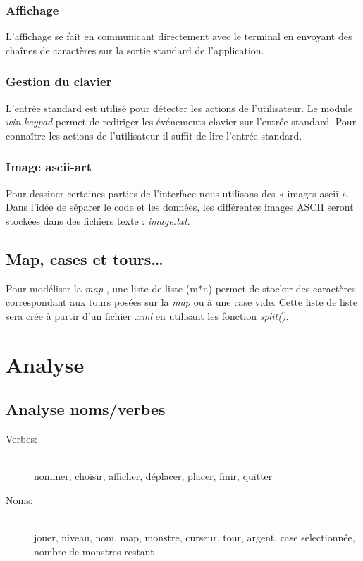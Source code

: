 \documentclass[a4paper]{article}
\begin{document}
            \subsubsection{Affichage}
            L'affichage se fait en communicant directement avec le terminal en envoyant des chaînes de
            caractères sur la sortie standard de l'application.

            \subsubsection{Gestion du clavier}
            L'entrée standard est utilisé pour détecter les actions de l'utilisateur.
            Le module \emph{win.keypad} permet de rediriger les événements clavier sur l'entrée standard.
            Pour connaître les actions de l'utilisateur il suffit de lire l'entrée standard.

            \subsubsection{Image ascii-art}
            Pour dessiner certaines parties de l'interface nous utilisons des « images ascii ».
            Dans l'idée de séparer le code et les données, les différentes images ASCII seront stockées dans des fichiers texte : \emph{image.txt}.

        \subsection{Map, cases et tours\ldots}
        Pour modéliser la \emph{map} , une liste de liste (m*n) permet de stocker des caractères correspondant aux tours posées sur la \emph{map} ou à une case vide.
        Cette liste de liste sera crée à partir d'un fichier .\emph{xml} en utilisant les fonction \emph{split()}.
    
    \section{Analyse}
        \subsection{Analyse noms/verbes}
            \begin{description}
                \item[Verbes:] \hfill \\
                    nommer, choisir, afficher, déplacer, placer, finir, quitter
                \item[Noms:] \hfill \\
                    jouer, niveau, nom, map, monstre, curseur, tour, argent, case selectionnée, nombre de monstres restant
           \end{description}
\end{document}
